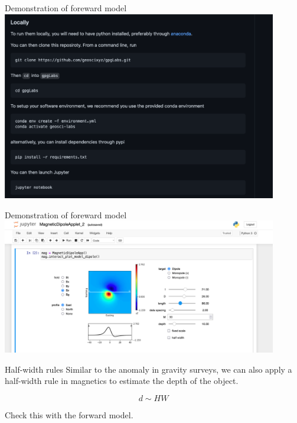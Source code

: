 \begin{frame}
  \begin{PointSix}{Demonstration of foreward model}
    \includegraphics[width=0.9\textwidth]{Figures/Magnetics/GeoXYZ_Setup.png}


  \end{PointSix}
\end{frame}

\begin{frame}
  \begin{PointSix}{Demonstration of foreward model}
    \includegraphics[width=0.9\textwidth]{Figures/Magnetics/GeosciXYZ_MagneticApplet.png}


  \end{PointSix}
\end{frame}

\begin{frame}
  \begin{PointSix}{Half-width rules}
   Similar to the anomaly in gravity surveys, we can also apply a half-width rule in magnetics to estimate the depth of the object. 

   $$
    d \sim HW
   $$

   Check this with the forward model.
  \end{PointSix}
\end{frame}







